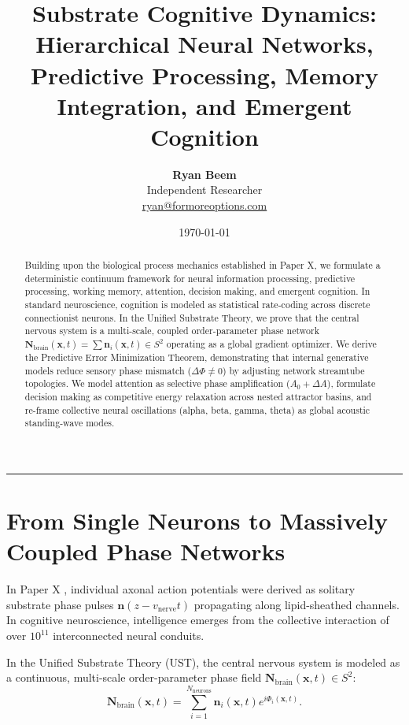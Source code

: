 \documentclass[11pt,a4paper]{article}
\title{\Large\bfseries Substrate Cognitive Dynamics: Hierarchical Neural Networks, Predictive Processing, Memory Integration, and Emergent Cognition}
\author{
	\textbf{Ryan Beem}\\[0.5em]
	\small Independent Researcher \\
	\small \href{mailto:ryan@formoreoptions.com}{ryan@formoreoptions.com}
}
\date{\today}
\begin{document}
	
	\maketitle
	
	\begin{abstract}
		Building upon the biological process mechanics established in Paper X, we formulate a deterministic continuum framework for neural information processing, predictive processing, working memory, attention, decision making, and emergent cognition. In standard neuroscience, cognition is modeled as statistical rate-coding across discrete connectionist neurons. In the Unified Substrate Theory, we prove that the central nervous system is a multi-scale, coupled order-parameter phase network $\mathbf{N}_{\text{brain}}(\mathbf{x}, t) = \sum \mathbf{n}_i(\mathbf{x}, t) \in S^2$ operating as a global gradient optimizer. We derive the Predictive Error Minimization Theorem, demonstrating that internal generative models reduce sensory phase mismatch ($\Delta \Phi \neq 0$) by adjusting network streamtube topologies. We model attention as selective phase amplification ($A_0 + \Delta A$), formulate decision making as competitive energy relaxation across nested attractor basins, and re-frame collective neural oscillations (alpha, beta, gamma, theta) as global acoustic standing-wave modes.
	\end{abstract}
	
	\vspace{1em}
	\hrule
	\vspace{1.5em}
	
	\section{From Single Neurons to Massively Coupled Phase Networks}
	\label{sec:intro_cognitive_networks}
	
	In Paper X \cite{PaperX}, individual axonal action potentials were derived as solitary substrate phase pulses $\mathbf{n}(z - v_{\text{nerve}} t)$ propagating along lipid-sheathed channels. In cognitive neuroscience, intelligence emerges from the collective interaction of over $10^{11}$ interconnected neural conduits.
	
	In the Unified Substrate Theory (UST), the central nervous system is modeled as a continuous, multi-scale order-parameter phase field $\mathbf{N}_{\text{brain}}(\mathbf{x}, t) \in S^2$:
	\begin{equation}
		\mathbf{N}_{\text{brain}}(\mathbf{x}, t) = \sum_{i=1}^{N_{\text{neurons}}} \mathbf{n}_i(\mathbf{x}, t) e^{i \Phi_i(\mathbf{x}, t)}.
		\label{eq:brain_phase_field}
	\end{equation}
	
\end{document}
